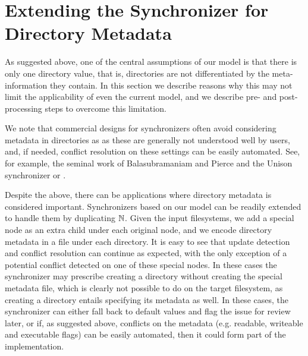 
\section{Extending the Synchronizer for Directory Metadata}

As suggested above, one of the central assumptions of our model is that
there is only one directory value, that is, directories are not differentiated
by the meta-information they contain.
In this section we describe reasons why this may not limit the applicability
of even the current model, and we describe pre- and post-processing steps
to overcome this limitation.

We note that commercial designs for synchronizers 
often avoid considering metadata in directories as
as these are generally not understood well by users,
and, if needed, conflict resolution on these settings can be easily automated.
See, for example, the seminal work of Balasubramaniam and Pierce and the Unison synchronizer \cite{BP} or \cite{BZ}.

Despite the above, there can be applications where directory metadata
is considered important.
Synchronizers based on our model can be readily extended to handle them
by duplicating $\mathbb{N}$. 
Given the input filesystems, we add a special node as an extra child under each original node,
and we encode directory metadata in a file under each directory.
It is easy to see that update detection and conflict resolution can continue as expected,
with the only exception of a potential conflict detected on one of these special nodes.
In these cases the synchronizer may prescribe creating a directory without creating
the special metadata file, which is clearly not possible to do on the target filesystem,
as creating a directory entails specifying its metadata as well.
In these cases, the synchronizer can either fall back to default values and flag the issue
for review later, or if, as suggested above, conflicts on the metadata (e.g. readable, writeable and executable flags)
can be easily automated, then it could form part of the implementation.
